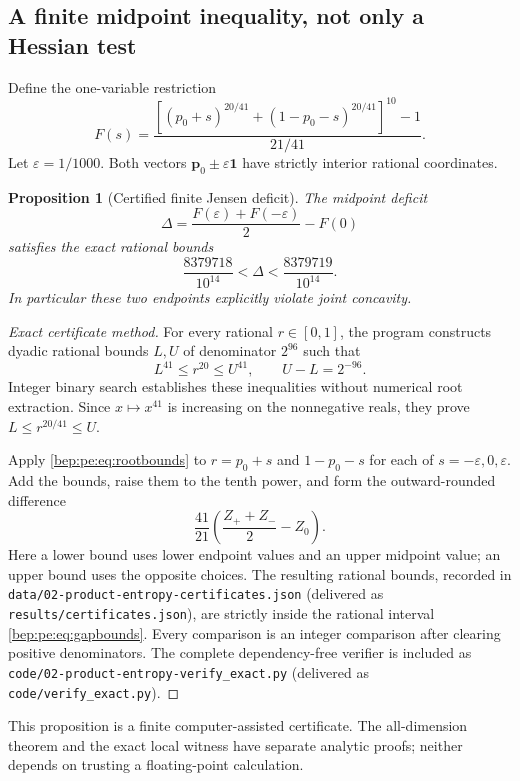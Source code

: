 \documentclass[11pt]{article}
\numberwithin{equation}{section}
\newtheorem{proposition}[theorem]{Proposition}
\theoremstyle{definition}
\theoremstyle{remark}
\newcommand{\p}{\boldsymbol p}
\newcommand{\one}{\boldsymbol 1}
\begin{document}
\subsection{A finite midpoint inequality, not only a Hessian test}
Define the one-variable restriction
\begin{equation}
 F(s)=\frac{[ (p_0+s)^{20/41}+(1-p_0-s)^{20/41}]^{10}-1}{21/41}.
\end{equation}
Let $\varepsilon=1/1000$. Both vectors $\p_0\pm\varepsilon\one$ have
strictly interior rational coordinates.

\begin{proposition}[Certified finite Jensen deficit]\label{bep:pe:prop:finite}
The midpoint deficit
\begin{equation}
 \Delta=\frac{F(\varepsilon)+F(-\varepsilon)}2-F(0)
\end{equation}
satisfies the exact rational bounds
\begin{equation}
 \frac{8379718}{10^{14}}<\Delta<\frac{8379719}{10^{14}}.
 \label{bep:pe:eq:gapbounds}
\end{equation}
In particular these two endpoints explicitly violate joint concavity.
\end{proposition}
\begin{proof}[Exact certificate method]
For every rational $r\in[0,1]$, the program constructs dyadic rational
bounds $L,U$ of denominator $2^{96}$ such that
\begin{equation}
 L^{41}\leq r^{20}\leq U^{41},\qquad U-L=2^{-96}.
 \label{bep:pe:eq:rootbounds}
\end{equation}
Integer binary search establishes these inequalities without numerical
root extraction. Since $x\mapsto x^{41}$ is increasing on the
nonnegative reals, they prove $L\leq r^{20/41}\leq U$.

Apply \eqref{bep:pe:eq:rootbounds} to $r=p_0+s$ and $1-p_0-s$ for each of
$s=-\varepsilon,0,\varepsilon$. Add the bounds, raise them to the tenth
power, and form the outward-rounded difference
\[
 \frac{41}{21}\left(\frac{Z_++Z_-}{2}-Z_0\right).
\]
Here a lower bound uses lower endpoint values and an upper midpoint
value; an upper bound uses the opposite choices. The resulting rational
bounds, recorded in
\nolinkurl{data/02-product-entropy-certificates.json} (delivered as
\nolinkurl{results/certificates.json}), are strictly
inside the rational interval \eqref{bep:pe:eq:gapbounds}. Every comparison is
an integer comparison after clearing positive denominators. The
complete dependency-free verifier is included as
\nolinkurl{code/02-product-entropy-verify_exact.py} (delivered as
\nolinkurl{code/verify_exact.py}).
\end{proof}
This proposition is a finite computer-assisted certificate. The
all-dimension theorem and the exact local witness have separate analytic
proofs; neither depends on trusting a floating-point calculation.
\end{document}
